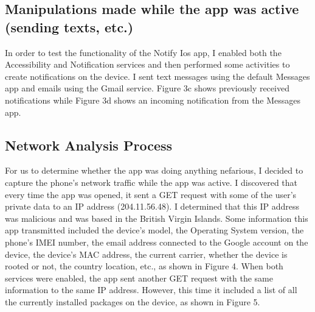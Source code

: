 \documentclass[conference]{IEEEtran}
\begin{document}
\subsection{Manipulations made while the app was active (sending texts, etc.)}
In order to test the functionality of the Notify Ios app, I enabled both the Accessibility and Notification services and then performed some activities to create notifications on the device. I sent text messages using the default Messages app and emails using the Gmail service. Figure 3c shows previously received notifications while Figure 3d shows an incoming notification from the Messages app.
\subsection{Network Analysis Process}
For us to determine whether the app was doing anything nefarious, I decided to capture the phone’s network traffic while the app was active. I discovered that every time the app was opened, it sent a GET request with some of the user’s private data to an IP address (204.11.56.48). I determined that this IP address was malicious and was based in the British Virgin Islands. Some information this app transmitted included the device’s model, the Operating System version, the phone’s IMEI number, the email address connected to the Google account on the device, the device’s MAC address, the current carrier, whether the device is rooted or not, the country location, etc., as shown in Figure 4. When both services were enabled, the app sent another GET request with the same information to the same IP address. However, this time it included a list of all the currently installed packages on the device, as shown in Figure 5.
\end{document}
